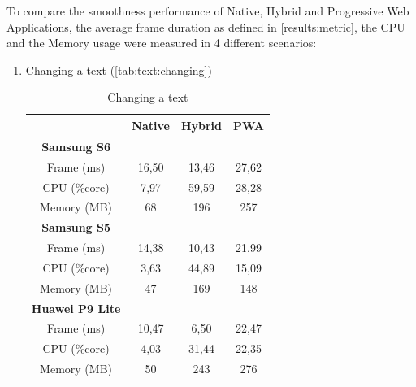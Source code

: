 \documentclass{kththesis}
\begin{document}
To compare the smoothness performance of Native, Hybrid and Progressive Web Applications, the average frame duration as defined in \autoref{results:metric}, the CPU and the Memory usage were measured in 4 different scenarios: 
\begin{enumerate} [ref={Scenario}\xspace\arabic*]
    \item \label{scenario:text:changing} Changing a text (\autoref{tab:text:changing})
    \begin{table}[]
        \centering
        \begin{tabular}{|c|c|c|c|}
            \hline
             & Native & Hybrid & PWA \\
             \hline
            \textbf{Samsung S6} &   &   &   \\
            Frame (ms) & 16,50 & 13,46 & 27,62 \\
            CPU (\%core) & 7,97 & 59,59 & 28,28 \\
            Memory (MB) & 68 & 196 & 257 \\
            \hline   
            \textbf{Samsung S5} &   &   &   \\
            Frame (ms) & 14,38 & 10,43 & 21,99 \\
            CPU (\%core) & 3,63 & 44,89 & 15,09 \\
            Memory (MB) & 47 & 169 & 148 \\
            \hline
            \textbf{Huawei P9 Lite} &   &   &   \\
            Frame (ms) & 10,47 & 6,50 & 22,47 \\
            CPU (\%core) & 4,03 & 31,44 & 22,35 \\
            Memory (MB) & 50 & 243 & 276 \\
            \hline
        \end{tabular}
        \caption{Changing a text}
        \label{tab:text:changing}
    \end{table}


\end{enumerate}
\end{document}
